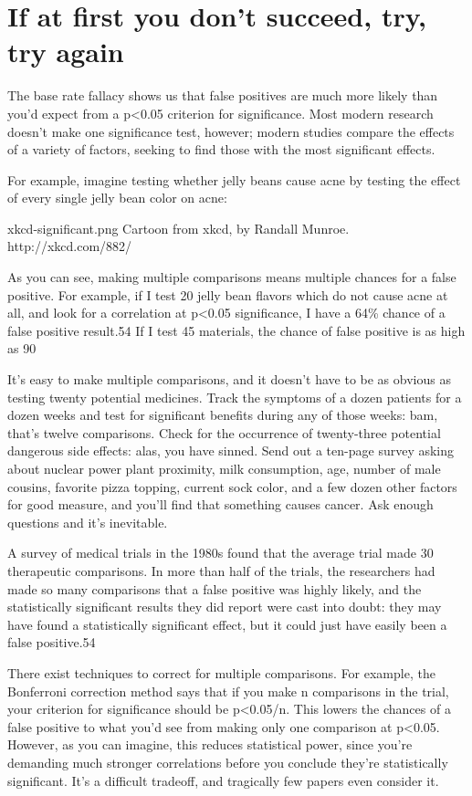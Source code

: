 \section{If at first you don’t succeed, try, try again}
\label{chp5:try-again}

The base rate fallacy shows us that false positives are much more likely than you’d expect from a p<0.05 criterion for significance. Most modern research doesn’t make one significance test, however; modern studies compare the effects of a variety of factors, seeking to find those with the most significant effects.

For example, imagine testing whether jelly beans cause acne by testing the effect of every single jelly bean color on acne:

xkcd-significant.png
Cartoon from xkcd, by Randall Munroe. http://xkcd.com/882/


As you can see, making multiple comparisons means multiple chances for a false positive. For example, if I test 20 jelly bean flavors which do not cause acne at all, and look for a correlation at p<0.05 significance, I have a 64\% chance of a false positive result.54 If I test 45 materials, the chance of false positive is as high as 90%

It’s easy to make multiple comparisons, and it doesn’t have to be as obvious as testing twenty potential medicines. Track the symptoms of a dozen patients for a dozen weeks and test for significant benefits during any of those weeks: bam, that’s twelve comparisons. Check for the occurrence of twenty-three potential dangerous side effects: alas, you have sinned. Send out a ten-page survey asking about nuclear power plant proximity, milk consumption, age, number of male cousins, favorite pizza topping, current sock color, and a few dozen other factors for good measure, and you’ll find that something causes cancer. Ask enough questions and it’s inevitable.

A survey of medical trials in the 1980s found that the average trial made 30 therapeutic comparisons. In more than half of the trials, the researchers had made so many comparisons that a false positive was highly likely, and the statistically significant results they did report were cast into doubt: they may have found a statistically significant effect, but it could just have easily been a false positive.54

There exist techniques to correct for multiple comparisons. For example, the Bonferroni correction method says that if you make n comparisons in the trial, your criterion for significance should be p<0.05/n. This lowers the chances of a false positive to what you’d see from making only one comparison at p<0.05. However, as you can imagine, this reduces statistical power, since you’re demanding much stronger correlations before you conclude they’re statistically significant. It’s a difficult tradeoff, and tragically few papers even consider it.

